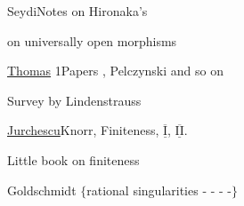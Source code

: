Seydi\qquad Notes on Hironaka's 

 on universally open morphisms

\uline{Thomas} 1\qquad Papers , Pelczynski and so on

Survey by Lindenstrauss \unsure{---|--}

\uline{Jurchescu}\qquad Knorr, Finiteness, $\overline{\underline{\mathrm I}}$, $\overline{\underline{\mathrm {II}}}$.

Little book on finiteness

Goldschmidt\qquad {} $\{$rational singularities - - - -$\}$

\qquad {}

\clearpage
\normalmarginpar
